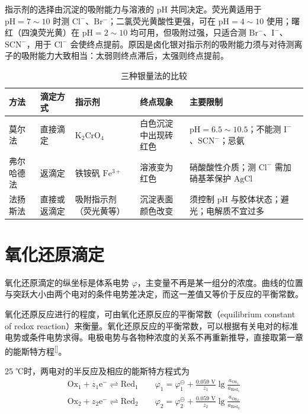 \documentclass[UTF8]{ctexbook}
\begin{document}
指示剂的选择由沉淀的吸附能力与溶液的 $\mathrm{pH}$ 共同决定。荧光黄适用于 $\mathrm{pH}=7\sim10$ 时测 $\mathrm{Cl^-}$、$\mathrm{Br^-}$；二氯荧光黄酸性更强，可在 $\mathrm{pH}=4\sim10$ 使用；曙红（四溴荧光黄）在 $\mathrm{pH}=2\sim10$ 均可用，但吸附过强，只适合测 $\mathrm{Br^-}$、$\mathrm{I^-}$、$\mathrm{SCN^-}$，用于 $\mathrm{Cl^-}$ 会使终点提前。原因是卤化银对指示剂的吸附能力须与对待测离子的吸附能力大致相当：太弱则终点滞后，太强则终点提前。

\begin{table}[H]
\centering
\caption{三种银量法的比较}
\begin{tabularx}{\textwidth}{l l l X X}
\toprule
方法 & 滴定方式 & 指示剂 & 终点现象 & 主要限制 \\
\midrule
莫尔法 & 直接滴定 & $\mathrm{K_2CrO_4}$ & 白色沉淀中出现砖红色 &
$\mathrm{pH}=6.5\sim10.5$；不能测 $\mathrm{I^-}$、$\mathrm{SCN^-}$；忌氨 \\
弗尔哈德法 & 返滴定 & 铁铵矾 $\mathrm{Fe^{3+}}$ & 溶液变为红色 &
硝酸酸性介质；测 $\mathrm{Cl^-}$ 需加硝基苯保护 $\mathrm{AgCl}$ \\
法扬斯法 & 直接或返滴定 & 吸附指示剂（荧光黄等） & 沉淀表面颜色改变 &
须控制 $\mathrm{pH}$ 与胶体状态；避光；电解质不宜过多 \\
\bottomrule
\end{tabularx}
\end{table}

\newpage
\section{氧化还原滴定}
\label{sec:redox-titration}

氧化还原滴定的纵坐标是体系电势 $\varphi$，主变量不再是某一组分的浓度。曲线的位置与突跃大小由两个电对的条件电势差决定，而这一差值又等价于反应的平衡常数。

氧化还原反应进行的程度，可由氧化还原反应的平衡常数（equilibrium constant of redox reaction）来衡量。氧化还原反应的平衡常数，可以根据有关电对的标准电势或条件电势求得。电极电势与各物种浓度的关系不再重新推导，直接取第一章的能斯特方程\textsuperscript{[\pageref{sec:nernst}]}。

25 ℃时，两电对的半反应及相应的能斯特方程式为
\[\begin{gathered}
\text{Ox}_1 + z_1\text{e}^- \rightleftharpoons \text{Red}_1 \qquad \varphi_1 = \varphi_1^\ominus + \frac{0.059\text{ V}}{z_1} \lg \frac{a_{\text{Ox}_1}}{a_{\text{Red}_1}} \\
\text{Ox}_2 + z_2\text{e}^- \rightleftharpoons \text{Red}_2 \qquad \varphi_2 = \varphi_2^\ominus + \frac{0.059\text{ V}}{z_2} \lg \frac{a_{\text{Ox}_2}}{a_{\text{Red}_2}}
\end{gathered}\]
\end{document}
